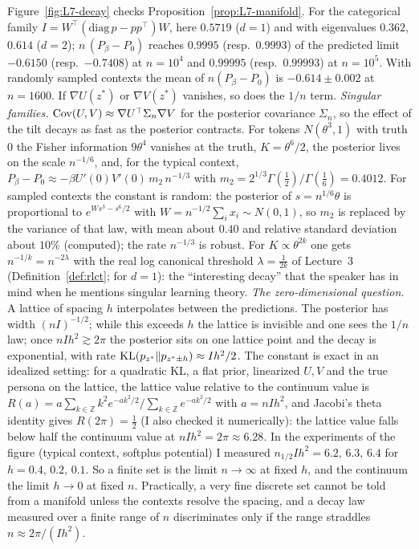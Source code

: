 \begin{beyond}\label{box:L7-check}
Figure~\ref{fig:L7-decay} checks Proposition~\ref{prop:L7-manifold}. For the categorical family $I=W^{\top}(\mathrm{diag}\,p-pp^{\top})W$, here $0.5719$ ($d=1$) and with eigenvalues $0.362$, $0.614$ ($d=2$); $n\,(P_\beta-P_0)$ reaches $0.9995$ (resp.\ $0.9993$) of the predicted limit $-0.6150$ (resp.\ $-0.7408$) at $n=10^4$ and $0.99995$ (resp.\ $0.99993$) at $n=10^5$. With randomly sampled contexts the mean of $n(P_\beta-P_0)$ is $-0.614\pm0.002$ at $n=1600$. If $\nabla U(z^*)$ or $\nabla V(z^*)$ vanishes, so does the $1/n$ term.
\emph{Singular families.} $\operatorname{Cov}(U,V)\approx\nabla U^{\top}\Sigma_n\nabla V$ for the posterior covariance $\Sigma_n$, so the effect of the tilt decays as fast as the posterior contracts. For tokens $N(\theta^3,1)$ with truth $0$ the Fisher information $9\theta^4$ vanishes at the truth, $K=\theta^6/2$, the posterior lives on the scale $n^{-1/6}$, and, for the typical context, $P_\beta-P_0\approx-\beta U'(0)V'(0)\,m_2\,n^{-1/3}$ with $m_2=2^{1/3}\Gamma(\frac12)/\Gamma(\frac16)=0.4012$. For sampled contexts the constant is random: the posterior of $s=n^{1/6}\theta$ is proportional to $e^{Ws^3-s^6/2}$ with $W=n^{-1/2}\sum_ix_i\sim N(0,1)$, so $m_2$ is replaced by the variance of that law, with mean about $0.40$ and relative standard deviation about $10\%$ (computed); the rate $n^{-1/3}$ is robust. For $K\propto\theta^{2k}$ one gets $n^{-1/k}=n^{-2\lambda}$ with the real log canonical threshold $\lambda=\frac1{2k}$ of Lecture~3 (Definition~\ref{def:rlct}; for $d=1$): the ``interesting decay'' that the speaker has in mind when he mentions singular learning theory.
\emph{The zero-dimensional question.} A lattice of spacing $h$ interpolates between the predictions. The posterior has width $(nI)^{-1/2}$; while this exceeds $h$ the lattice is invisible and one sees the $1/n$ law; once $nIh^2\gtrsim2\pi$ the posterior sits on one lattice point and the decay is exponential, with rate $\operatorname{KL}(p_{z^*}\|p_{z^*\pm h})\approx Ih^2/2$. The constant is exact in an idealized setting: for a quadratic KL, a flat prior, linearized $U,V$ and the true persona on the lattice, the lattice value relative to the continuum value is $R(a)=a\sum_{k\in\mathbb Z}k^2e^{-ak^2/2}\big/\sum_{k\in\mathbb Z}e^{-ak^2/2}$ with $a=nIh^2$, and Jacobi's theta identity gives $R(2\pi)=\frac12$ (I also checked it numerically): the lattice value falls below half the continuum value at $nIh^2=2\pi\approx6.28$. In the experiments of the figure (typical context, softplus potential) I measured $n_{1/2}Ih^2=6.2,\,6.3,\,6.4$ for $h=0.4,\,0.2,\,0.1$. So a finite set is the limit $n\to\infty$ at fixed $h$, and the continuum the limit $h\to0$ at fixed $n$. Practically, a very fine discrete set cannot be told from a manifold unless the contexts resolve the spacing, and a decay law measured over a finite range of $n$ discriminates only if the range straddles $n\approx2\pi/(Ih^2)$.
\end{beyond}

